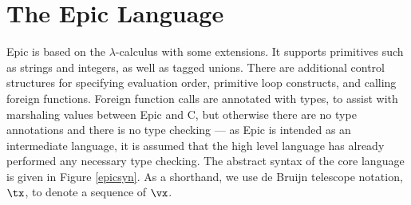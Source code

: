 \section{The Epic Language}

Epic is based on the $\lambda$-calculus with some extensions.
It supports primitives such as strings and integers, as well as tagged
unions. There are additional control structures for specifying
evaluation order, primitive loop constructs, and calling foreign
functions. Foreign function calls are annotated with types, to assist
with marshaling values between Epic and C, but otherwise there are no
type annotations and there is no type checking --- as Epic is intended
as an intermediate language, it is assumed that the high level
language has already performed any necessary type checking. The
abstract syntax of the core language is given in Figure \ref{epicsyn}.
As a shorthand, we use de Bruijn telescope notation, $\tx$, to denote
a sequence of $\vx$.

\newcommand{\Con}[2]{\DC{Con}\:#1(#2)}

